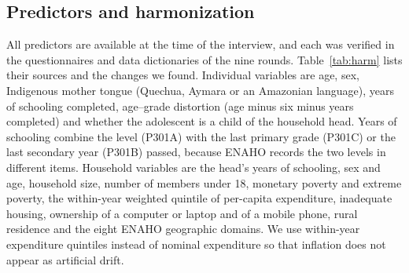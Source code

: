 \documentclass[conference]{IEEEtran}
\begin{document}
\subsection{Predictors and harmonization}
All predictors are available at the time of the interview, and each was verified in the questionnaires and data dictionaries of the nine rounds. Table~\ref{tab:harm} lists their sources and the changes we found. Individual variables are age, sex, Indigenous mother tongue (Quechua, Aymara or an Amazonian language), years of schooling completed, age--grade distortion (age minus six minus years completed) and whether the adolescent is a child of the household head. Years of schooling combine the level (P301A) with the last primary grade (P301C) or the last secondary year (P301B) passed, because ENAHO records the two levels in different items. Household variables are the head's years of schooling, sex and age, household size, number of members under 18, monetary poverty and extreme poverty, the within-year weighted quintile of per-capita expenditure, inadequate housing, ownership of a computer or laptop and of a mobile phone, rural residence and the eight ENAHO geographic domains. We use within-year expenditure quintiles instead of nominal expenditure so that inflation does not appear as artificial drift.
\end{document}
